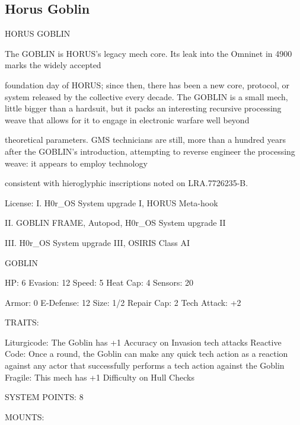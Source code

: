 \subsection{Horus Goblin}


                                          HORUS GOBLIN  

The GOBLIN is HORUS’s legacy mech core. Its leak into the Omninet in 4900 marks the widely accepted  

foundation day of HORUS; since then, there has been a new core, protocol, or system released by the  
collective every decade. The GOBLIN is a small mech, little bigger than a hardsuit, but it packs an  
interesting recursive processing weave that allows for it to engage in electronic warfare well beyond  

theoretical parameters. GMS technicians are still, more than a hundred years after the GOBLIN’s  
introduction, attempting to reverse engineer the processing weave: it appears to employ technology  

consistent with hieroglyphic inscriptions noted on LRA.7726235-B.       

                                                  License:  
I. H0r\_OS System upgrade I, HORUS Meta-hook
 
II. GOBLIN FRAME, Autopod, H0r\_OS System upgrade II
 
III. H0r\_OS System upgrade III, OSIRIS Class AI
 

                                                  GOBLIN 

  HP: 6          Evasion: 12                          Speed: 5           Heat Cap: 4       Sensors: 20 

  Armor: 0       E-Defense: 12                        Size: 1/2          Repair Cap: 2     Tech Attack:  
                                                                                           +2 

                                                   TRAITS: 

  Liturgicode: The Goblin has +1 Accuracy on Invasion tech attacks 
  Reactive Code: Once a round, the Goblin can make any quick tech action as a reaction against  
  any actor that successfully performs a tech action against the Goblin 
  Fragile: This mech has +1 Difficulty on Hull Checks 

                                            SYSTEM POINTS: 8 

                                                  MOUNTS: 

